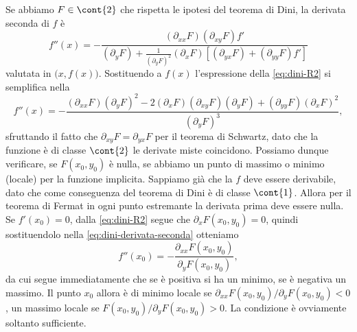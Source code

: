 Se abbiamo $F\in\cont{2}$ che rispetta le ipotesi del teorema di Dini, la derivata seconda di $f$ è
\begin{equation}
	f''(x)=-\frac{(\partial_{xx}F)(\partial_{xy}F)f'}{(\partial_yF)+\frac1{(\partial_yF)^2}(\partial_xF)[(\partial_{yx}F)+(\partial_{yy}F)f']}
\end{equation}
valutata in $\big(x,f(x)\big)$. Sostituendo a $f(x)$ l'espressione della \eqref{eq:dini-R2} si semplifica nella
\begin{equation} 
	f''(x)=-\frac{(\partial_{xx}F)(\partial_yF)^2-2(\partial_xF)(\partial_{xy}F)(\partial_yF)+(\partial_{yy}F)(\partial_xF)^2}{(\partial_yF)^3},
	\label{eq:dini-derivata-seconda}
\end{equation}
sfruttando il fatto che $\partial_{xy}F=\partial_{yx}F$ per il teorema di Schwartz, dato che la funzione è di classe $\cont{2}$ le derivate miste coincidono.
Possiamo dunque verificare, se $F(x_0,y_0)$ è nulla, se abbiamo un punto di massimo o minimo (locale) per la funzione implicita. Sappiamo già che la $f$ deve essere derivabile, dato che come conseguenza del teorema di Dini è di classe $\cont{1}$. Allora per il teorema di Fermat in ogni punto estremante la derivata prima deve essere nulla. Se $f'(x_0)=0$, dalla \eqref{eq:dini-R2} segue che $\partial_xF(x_0,y_0)=0$, quindi sostituendolo nella \eqref{eq:dini-derivata-seconda} otteniamo
\begin{equation} 
	f''(x_0)=-\frac{\partial_{xx}F(x_0,y_0)}{\partial_yF(x_0,y_0)},
	\label{eq:derivata-seconda-semplificata-dini}
\end{equation}
da cui segue immediatamente che se è positiva si ha un minimo, se è negativa un massimo. Il punto $x_0$ allora è di minimo locale se $\partial_{xx}F(x_0,y_0)/\partial_yF(x_0,y_0)<0$, un massimo locale se $F(x_0,y_0)/\partial_yF(x_0,y_0)>0$.
La condizione è ovviamente soltanto sufficiente.

